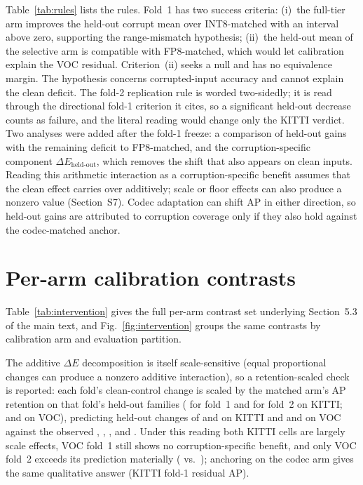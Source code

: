 \documentclass[10pt]{article}
\begin{document}
Table~\ref{tab:rules} lists the rules. Fold~1 has two success criteria:
(i)~the full-tier arm improves the held-out corrupt mean over INT8-matched
with an interval above zero, supporting the range-mismatch hypothesis;
(ii)~the held-out mean of the selective arm is compatible with FP8-matched,
which would let calibration explain the VOC residual. Criterion~(ii) seeks a
null and has no equivalence margin. The hypothesis concerns corrupted-input
accuracy and cannot explain the clean deficit. The fold-2 replication rule is
worded two-sidedly; it is read through the directional fold-1 criterion it
cites, so a significant held-out decrease counts as failure, and the literal
reading would change only the KITTI verdict. Two analyses were added after the
fold-1 freeze: a comparison of held-out gains with the remaining deficit to
FP8-matched, and the corruption-specific component $\Delta E_{\text{held-out}}$,
which removes the shift that also appears on clean inputs. Reading this
arithmetic interaction as a corruption-specific benefit assumes that the clean
effect carries over additively; scale or floor effects can also produce a
nonzero value (Section~S7). Codec adaptation can shift AP in either
direction, so held-out gains are attributed to corruption coverage only if they
also hold against the codec-matched anchor.

\section{Per-arm calibration contrasts}
\label{sec:supp-intervention}

Table~\ref{tab:intervention} gives the full per-arm contrast set underlying
Section~5.3 of the main text, and Fig.~\ref{fig:intervention} groups the same
contrasts by calibration arm and evaluation partition.

The additive $\Delta E$ decomposition is itself scale-sensitive (equal
proportional changes can produce a nonzero additive interaction), so a
retention-scaled check is reported: each fold's clean-control change is scaled by
the matched arm's AP retention on that fold's held-out families
(\nnRetHoFmKitti{} for fold~1 and \nnRetHoNjKitti{} for fold~2 on KITTI;
\nnRetHoFmVoc{} and \nnRetHoNjVoc{} on VOC), predicting held-out changes of
\nnPredCcHoKitti{} and \nnPredCtHoKitti{} on KITTI and \nnPredCcHoVoc{} and
\nnPredCtHoVoc{} on VOC against the observed \nnCcHKittiP, \nnCtHKittiP,
\nnCcHVocP, and \nnCtHVocP. Under this reading both KITTI cells are largely
scale effects, VOC fold~1 still shows no corruption-specific benefit, and
only VOC fold~2 exceeds its prediction materially (\nnCtHVocP{} vs.\
\nnPredCtHoVoc{}); anchoring on the codec arm gives the same qualitative
answer (KITTI fold-1 residual \nnResidCcQHoKitti{} AP).
\end{document}
